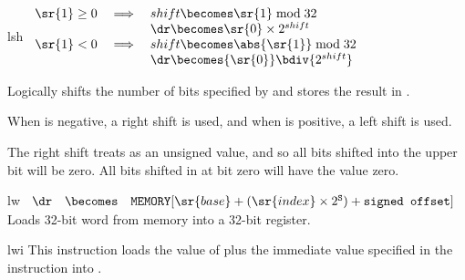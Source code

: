 \begin{instruction}{lsh}
   {\rlshopc}
   {
     \begin{math}
       \begin{array}{rcl}
         \sr{1} \geq 0 & \implies & shift \becomes \sr{1} \bmod 32  \\
                       &          & \dr \becomes \sr{0} \times 2^{shift}  \\
         \sr{1} <    0 & \implies & shift \becomes \abs{\sr{1}} \bmod 32        \\
                       &          & \dr \becomes {\sr{0}} \bdiv {2^{shift} }\\
       \end{array}
     \end{math}
   }
   {
     Logically shifts  the number of bits specified by 
     and stores the result in \dr.

     When  is negative, a right shift is used, and when 
     is positive, a left shift is used.

     The right shift treats  as an unsigned value, and so all
     bits shifted into the upper bit will be zero.  All bits shifted
     in at bit zero will have the value zero.
   }
\end{instruction}


\begin{instruction}{lw}
     {\lwopc}
     {
       \begin{math}
         \begin{array}{lcl}
           {\dr} & \becomes & \texttt{MEMORY}[\sr{base} +
            (\sr{index} \times 2^{\texttt{S}}) + \texttt{signed offset}] \\
         \end{array}
       \end{math}
     }
     {
       Loads 32-bit word from memory into a 32-bit register.
     }
\end{instruction}


\begin{instruction}{lwi}
     {\lwiopc}
     {
       This instruction loads the value of  plus the
       immediate value specified in the instruction into \dr.
     }
\end{instruction}

